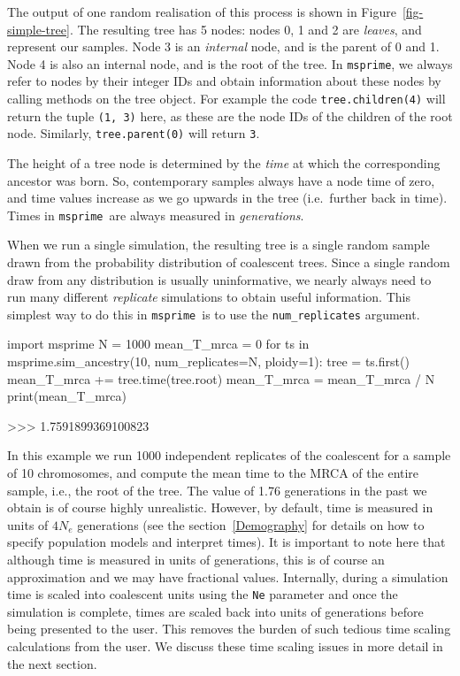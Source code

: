 \documentclass[graybox]{svmult}
\newcommand{\msprime}[0]{\texttt{msprime}}
\begin{document}
The output of one random realisation of this process is shown in
Figure~\ref{fig-simple-tree}. The resulting tree has 5 nodes: nodes 0, 1 and 2 are \emph{leaves}, and
represent our samples. Node 3 is an \emph{internal} node, and is the
parent of 0 and 1. Node 4 is also an internal node, and is the root of
the tree. In \msprime, we always refer to nodes by their integer IDs and
obtain information about these nodes by calling methods on the tree
object. For example the code \texttt{tree.children(4)} will return the
tuple \texttt{(1,\ 3)} here, as these are the node IDs of the children
of the root node. Similarly, \texttt{tree.parent(0)} will return
\texttt{3}.

The height of a tree node is determined by the \emph{time} at which the corresponding
ancestor was born. So,
contemporary samples always have a node time of zero, and time values
increase as we go upwards in the tree (i.e.\ further back in time). Times
in \msprime\ are always measured in \emph{generations}.

When we run a single simulation, the resulting tree is a single random
sample drawn from the probability distribution of coalescent trees. Since a
single random draw from any distribution is usually uninformative, we
nearly always need to run many different \emph{replicate} simulations to
obtain useful information. This simplest way to do this in \msprime\ is to
use the \texttt{num\_replicates} argument.

\begin{pythoncode}
import msprime
N = 1000
mean_T_mrca = 0
for ts in msprime.sim_ancestry(10, num_replicates=N, ploidy=1):
    tree = ts.first()
    mean_T_mrca += tree.time(tree.root)
mean_T_mrca = mean_T_mrca / N
print(mean_T_mrca)

>>> 1.7591899369100823
\end{pythoncode}

    In this example we run 1000 independent replicates of the coalescent for
a sample of 10 chromosomes, and compute the mean time to the MRCA of the entire sample, i.e., the root of the
tree. The value of 1.76 generations in the past we obtain is of course highly unrealistic.
However, by default, time is measured in units of \(4 N_e\) generations (see the section~\ref{Demography}
for details on how to specify population models and interpret times). It is important to note here
that although time is measured in units of generations, this is of course
an approximation and we may have fractional values. Internally,
during a simulation time is scaled into coalescent units
using the \texttt{Ne} parameter and once the
simulation is complete, times are scaled back into units of generations
before being presented to the user. This removes the burden of such
tedious time scaling calculations from the user. We discuss these time
scaling issues in more detail in the next section.
\end{document}

